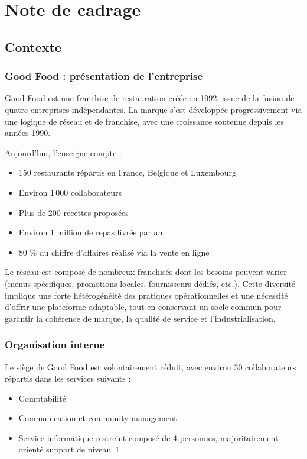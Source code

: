 \chapter{Note de cadrage}

\section{Contexte}

\subsection{Good Food : présentation de l'entreprise}
Good Food est une franchise de restauration créée en 1992, issue de la fusion de quatre entreprises indépendantes. La marque s’est développée progressivement via une logique de réseau et de franchise, avec une croissance soutenue depuis les années 1990.

Aujourd’hui, l’enseigne compte :
\begin{itemize}
    \item 150 restaurants répartis en France, Belgique et Luxembourg
    \item Environ 1\,000 collaborateurs
    \item Plus de 200 recettes proposées
    \item Environ 1 million de repas livrés par an
    \item 80 \% du chiffre d’affaires réalisé via la vente en ligne
\end{itemize}

Le réseau est composé de nombreux franchisés dont les besoins peuvent varier (menus spécifiques, promotions locales, fournisseurs dédiés, etc.). Cette diversité implique une forte hétérogénéité des pratiques opérationnelles et une nécessité d’offrir une plateforme adaptable, tout en conservant un socle commun pour garantir la cohérence de marque, la qualité de service et l’industrialisation.

\subsection{Organisation interne}
Le siège de Good Food est volontairement réduit, avec environ 30 collaborateurs répartis dans les services suivants :
\begin{itemize}
    \item Comptabilité
    \item Communication et community management
    \item Service informatique restreint composé de 4 personnes, majoritairement orienté support de niveau~1
\end{itemize}

